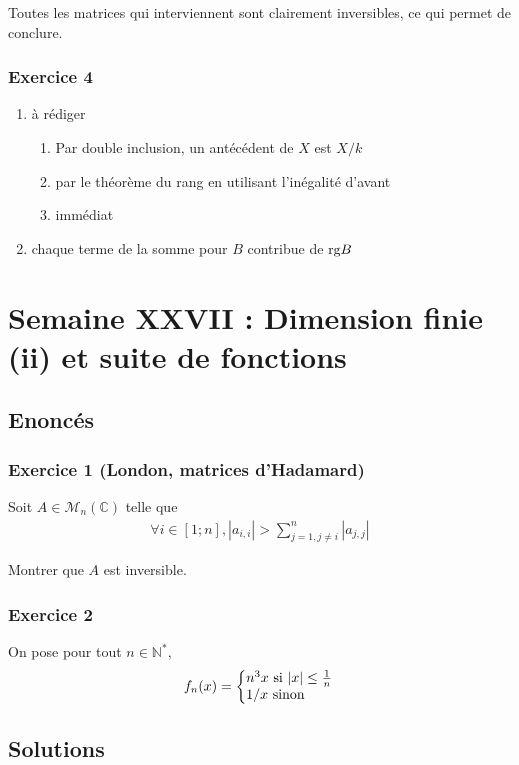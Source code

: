 \documentclass{article}
\begin{document}
Toutes les matrices qui interviennent sont clairement inversibles, ce qui permet de conclure.
\subsubsection*{Exercice  4}
\begin{enumerate}
\item à rédiger
\begin{enumerate}
\item Par double inclusion, un antécédent de $X$ est $X/k$ 
\item par le théorème du rang en utilisant l'inégalité d'avant 
\item immédiat
\end{enumerate}
\item chaque terme de la somme pour $B$ contribue de $\textup{rg} B$
\end{enumerate}
\section{Semaine XXVII : Dimension finie (ii) et suite de fonctions}
\subsection*{Enoncés}
\subsubsection*{Exercice 1 (London, matrices d'Hadamard)}
Soit $A\in \mathcal{M}_n(\mathbb{C})$ telle que 
\begin{align*}
\forall i\in [1;n], |a_{i,i}|>\sum_{j=1,j\neq i}^{n}|a_{j,j}|
\end{align*}

Montrer que $A$ est inversible.
\subsubsection*{Exercice 2}
On pose pour tout $n\in\mathbb{N}^*$, \begin{align*}
f_n(x) =  \left\{
     \begin{array}{@{}l@{\thinspace}l}
  n^3x \textup{ si } |x|\leq \frac{1}{n}\\
  1/x \textup{ sinon}
     \end{array}
   \right.   
\end{align*}
\subsection*{Solutions}
\end{document}
